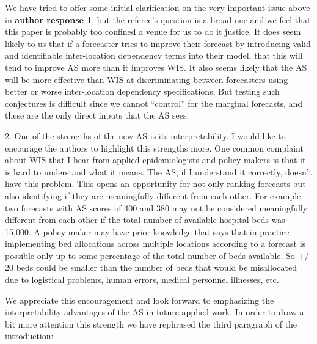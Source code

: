 \documentclass{article}
\begin{document}
We have tried to offer some initial clarification on the very important issue above in \textbf{author response 1}, but the referee's question is a broad one
and we feel that this paper is probably too confined a venue for us to do it justice. It does seem likely to us that if a forecaster tries to improve their forecast by introducing valid and identifiable inter-location dependency terms into their model, that this will tend to improve AS more than it improves WIS.  It also seems likely that the AS will be more effective than WIS at discriminating between forecasters using better or worse inter-location dependency specifications. 
But testing such conjectures is difficult since we cannot “control” for the marginal forecasts, and these are the only direct inputs that the AS sees.


\begin{quotebar}
2. One of the strengths of the new AS is its interpretability. I would like to encourage the authors to highlight this strengths more. One common complaint about WIS that I hear from applied epidemiologists and policy makers is that it is hard to understand what it means. The AS, if I understand it correctly, doesn't have this problem. This opens an opportunity for not only ranking forecasts but also identifying if they are meaningfully different from each other. For example, two forecasts with AS scores of 400 and 380 may not be considered meaningfully different from each other if the total number of available hospital beds was 15,000. A policy maker may have prior knowledge that says that in practice implementing bed allocations across multiple locations according to a forecast is possible only up to some percentage of the total number of beds available. So +/- 20 beds could be smaller than the number of beds that would be misallocated due to logistical problems, human errors, medical personnel illnesses, etc.
\end{quotebar}

We appreciate this encouragement and look forward to emphasizing the interpretability advantages of the AS in future applied work.  In order to draw 
a bit more attention this strength we have rephrased the third paragraph of the introduction:
\end{document}
